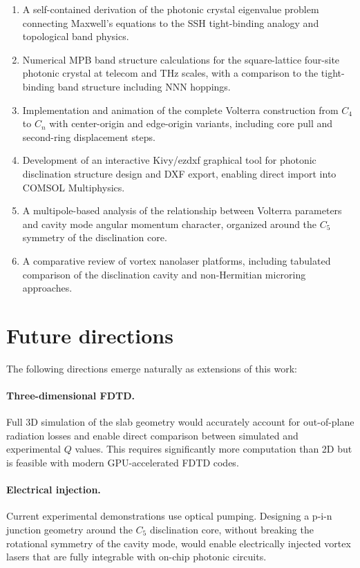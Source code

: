 \documentclass[12pt,a4paper,oneside]{book}
\theoremstyle{plain}
\theoremstyle{definition}
\theoremstyle{remark}
\begin{document}
\begin{enumerate}
  \item A self-contained derivation of the photonic crystal eigenvalue problem connecting Maxwell's equations to the SSH tight-binding analogy and topological band physics.
  \item Numerical MPB band structure calculations for the square-lattice four-site photonic crystal at telecom and THz scales, with a comparison to the tight-binding band structure including NNN hoppings.
  \item Implementation and animation of the complete Volterra construction from $C_4$ to $C_n$ with center-origin and edge-origin variants, including core pull and second-ring displacement steps.
  \item Development of an interactive Kivy/ezdxf graphical tool for photonic disclination structure design and DXF export, enabling direct import into COMSOL Multiphysics.
  \item A multipole-based analysis of the relationship between Volterra parameters and cavity mode angular momentum character, organized around the $C_5$ symmetry of the disclination core.
  \item A comparative review of vortex nanolaser platforms, including tabulated comparison of the disclination cavity and non-Hermitian microring approaches.
\end{enumerate}

\section{Future directions}
\label{sec:future}

The following directions emerge naturally as extensions of this work:

\paragraph{Three-dimensional FDTD.} Full 3D simulation of the slab geometry would accurately account for out-of-plane radiation losses and enable direct comparison between simulated and experimental $Q$ values. This requires significantly more computation than 2D but is feasible with modern GPU-accelerated FDTD codes.

\paragraph{Electrical injection.} Current experimental demonstrations use optical pumping. Designing a p-i-n junction geometry around the $C_5$ disclination core, without breaking the rotational symmetry of the cavity mode, would enable electrically injected vortex lasers that are fully integrable with on-chip photonic circuits.
\end{document}
